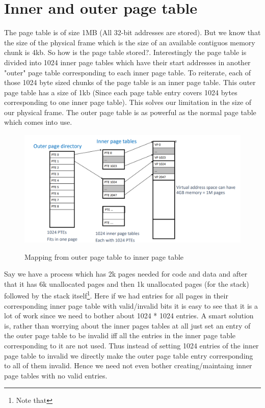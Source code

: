 \documentclass[12pt]{article}
\begin{document}
\section*{Inner and outer page table}
The page table is of size 1MB (All 32-bit addresses are stored). But we know that the size of the physical frame which is the size of an available contiguos memory chunk is 4kb. 
So how is the page table stored?. Interestingly the page table is divided into 1024 inner page tables which have their start addresses in another "outer" page table corresponding to each inner page table. To reiterate, each of those 1024 byte sized chunks of the page table is an inner page table.
This outer page table has a size of 1kb (Since each page table entry covers 1024 bytes corresponding to one inner page table). 
This solves our limitation in the size of our physical frame. The outer page table is as powerful as the normal page table which comes into use.


\begin{figure}[h]
    \begin{center}
        \hspace{2cm}
        \includegraphics[width = 12cm]{inner_page_table.png}
        \label{figure:inner_page_table}
        \caption{Mapping from outer page table to inner page table }
    \end{center}
\end{figure}

Say we have a process which has 2k pages needed for code and data and after that it has 6k unallocated pages and then 1k unallocated pages (for the stack) followed by the stack itself\footnote{Note that }.
Here if we had entries for all pages in their corresponding inner page table with valid/invalid bits it is easy to see that it is a lot of work since we need to bother about 1024 * 1024 entries. A smart solution is, rather
than worrying about the inner pages tables at all just set an entry of the outer page table to be invalid iff all the entries in the inner page table corresponding to it are not used. Thus instead of setting 1024 entries of the inner page 
table to invalid we directly make the outer page table entry corresponding to all of them invalid. Hence we need not even bother creating/maintaing inner page tables with no valid entries.
\end{document}
